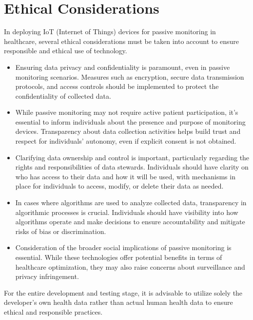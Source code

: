 \chapter{Ethical Considerations}

In deploying IoT (Internet of Things) devices for passive monitoring in healthcare, several ethical considerations must be taken into account to ensure responsible and ethical use of technology.
\begin{itemize}
    \item Ensuring data privacy and confidentiality is paramount, even in passive monitoring scenarios. Measures such as encryption, secure data transmission protocols, and access controls should be implemented to protect the confidentiality of collected data.
    \item While passive monitoring may not require active patient participation, it's essential to inform individuals about the presence and purpose of monitoring devices. Transparency about data collection activities helps build trust and respect for individuals' autonomy, even if explicit consent is not obtained.
    \item Clarifying data ownership and control is important, particularly regarding the rights and responsibilities of data stewards. Individuals should have clarity on who has access to their data and how it will be used, with mechanisms in place for individuals to access, modify, or delete their data as needed.
    \item In cases where algorithms are used to analyze collected data, transparency in algorithmic processes is crucial. Individuals should have visibility into how algorithms operate and make decisions to ensure accountability and mitigate risks of bias or discrimination.
    \item Consideration of the broader social implications of passive monitoring is essential. While these technologies offer potential benefits in terms of healthcare optimization, they may also raise concerns about surveillance and privacy infringement. 
\end{itemize}

\noindent For the entire development and testing stage, it is advisable to utilize solely the developer's own health data rather than actual human health data to ensure ethical and responsible practices.
